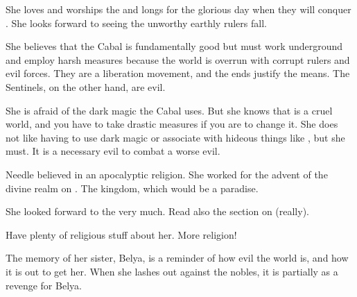 She loves and worships the \resphain{} and longs for the glorious day when they will conquer \Miith{}. 
She looks forward to seeing the unworthy earthly rulers fall. 

She believes that the Cabal is fundamentally good but must work underground and employ harsh measures because the world is overrun with corrupt rulers and evil forces. 
They are a liberation movement, and the ends justify the means. 
The Sentinels, on the other hand, are evil. 

She is afraid of the dark magic the Cabal uses.
But she knows that \Miith is a cruel world, and you have to take drastic measures if you are to change it.
She does not like having to use dark magic or associate with hideous things like \banes, but she must. 
It is a necessary evil to combat a worse evil. 

Needle believed in an apocalyptic religion.
She worked for the advent of the divine realm on \Miith.
The \resphan kingdom, which would be a paradise.

She looked forward to the  very much. 
Read also the section on  (really). 

Have plenty of religious stuff about her.
More religion!

The memory of her sister, Belya, is a reminder of how evil the world is, and how it is out to get her. 
When she lashes out against the nobles, it is partially as a revenge for Belya. 






